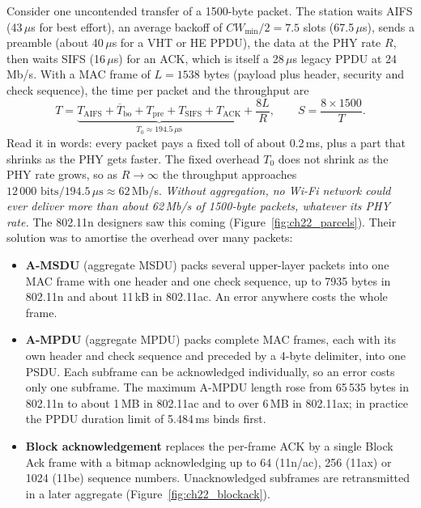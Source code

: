 Consider one uncontended transfer of a 1500-byte packet. The station waits AIFS (43\,$\mu$s for best
effort), an average backoff of $CW_{\min}/2=7.5$ slots (67.5\,$\mu$s), sends a preamble (about
40\,$\mu$s for a VHT or HE PPDU), the data at the PHY rate $R$, then waits SIFS (16\,$\mu$s) for an
ACK, which is itself a 28\,$\mu$s legacy PPDU at 24\,Mb/s. With a MAC frame of $L=1538$ bytes
(payload plus header, security and check sequence), the time per packet and the throughput are
\begin{equation}
T=\underbrace{T_{\text{AIFS}}+\overline{T}_{\text{bo}}+T_{\text{pre}}+T_{\text{SIFS}}+T_{\text{ACK}}}_{T_0\approx194.5\,\mu\text{s}}
+\frac{8L}{R},
\qquad
S=\frac{8\times1500}{T}.
\label{eq:ch22:macthr}
\end{equation}
Read it in words: every packet pays a fixed toll of about 0.2\,ms, plus a part that shrinks as the
PHY gets faster. The fixed overhead $T_0$ does not shrink as the PHY rate grows, so as
$R\to\infty$ the throughput approaches $12\,000\text{ bits}/194.5\,\mu\text{s}\approx62$\,Mb/s.
\emph{Without aggregation, no Wi-Fi network could ever deliver more than about 62\,Mb/s of 1500-byte
packets, whatever its PHY rate.} The 802.11n designers saw this coming (Figure~\ref{fig:ch22_parcels}). Their solution was to
amortise the overhead over many packets:
\begin{itemize}
\item \textbf{A-MSDU} (aggregate MSDU) packs several upper-layer packets into one MAC frame with one
header and one check sequence, up to 7935 bytes in 802.11n and about 11\,kB in 802.11ac. An error
anywhere costs the whole frame.
\item \textbf{A-MPDU} (aggregate MPDU) packs complete MAC frames, each with its own header and check
sequence and preceded by a 4-byte delimiter, into one PSDU. Each subframe can be acknowledged
individually, so an error costs only one subframe. The maximum A-MPDU length rose from 65\,535 bytes
in 802.11n to about 1\,MB in 802.11ac and to over 6\,MB in 802.11ax; in practice the PPDU duration
limit of 5.484\,ms binds first.
\item \textbf{Block acknowledgement} replaces the per-frame ACK by a single Block Ack frame with a
bitmap acknowledging up to 64 (11n/ac), 256 (11ax) or 1024 (11be) sequence numbers.
Unacknowledged subframes are retransmitted in a later aggregate (Figure~\ref{fig:ch22_blockack}).
\end{itemize}


